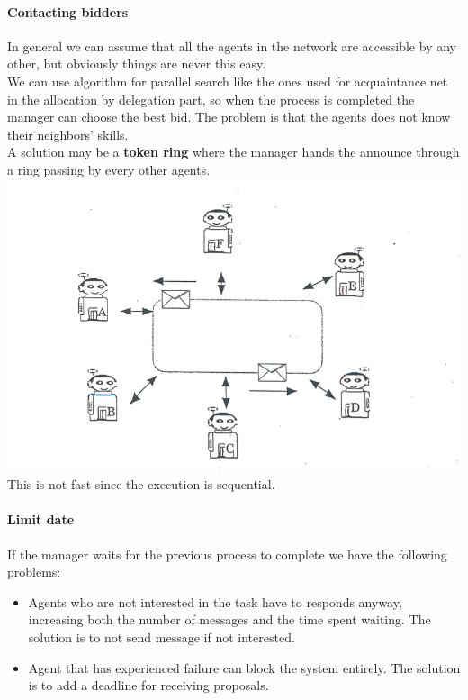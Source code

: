 \documentclass[10pt,a4paper]{article}
\begin{document}
\paragraph{Contacting bidders}
In general we can assume that all the agents in the network are accessible by any other, but obviously things are never this easy.\\
We can use algorithm for parallel search like the ones used for acquaintance net in the allocation by delegation part, so when the process is completed the manager can choose the best bid. The problem is that the agents does not know their neighbors' skills.\\
A solution may be a 	\textbf{token ring} where the manager hands the announce through a ring passing by every other agents.\\
\includegraphics[scale=0.7]{images/contract_token.png}\\
This is not fast since the execution is sequential.


\paragraph{Limit date}
If the manager waits for the previous process to complete we have the following problems:
\begin{itemize}
\item Agents who are not interested in the task have to responds anyway, increasing both the number of messages and the time spent waiting. The solution is to not send message if not interested.
\item Agent that has experienced failure can block the system entirely. The solution is to add a deadline for receiving proposals.
\end{itemize}
\end{document}
